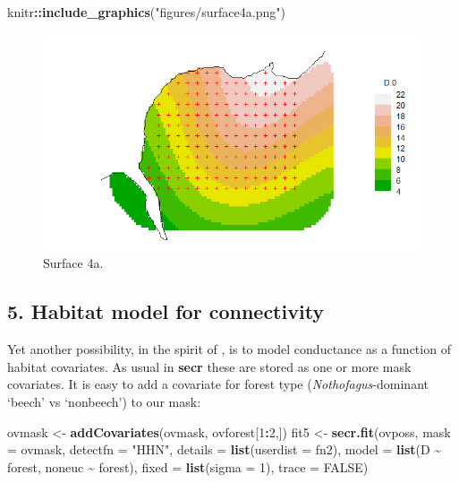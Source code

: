 \documentclass[
]{book}
\newenvironment{Shaded}{\begin{snugshade}}{\end{snugshade}}
\newcommand{\AttributeTok}[1]{\textcolor[rgb]{0.13,0.29,0.53}{#1}}
\newcommand{\ConstantTok}[1]{\textcolor[rgb]{0.56,0.35,0.01}{#1}}
\newcommand{\DecValTok}[1]{\textcolor[rgb]{0.00,0.00,0.81}{#1}}
\newcommand{\FunctionTok}[1]{\textcolor[rgb]{0.13,0.29,0.53}{\textbf{#1}}}
\newcommand{\NormalTok}[1]{#1}
\newcommand{\OtherTok}[1]{\textcolor[rgb]{0.56,0.35,0.01}{#1}}
\newcommand{\SpecialCharTok}[1]{\textcolor[rgb]{0.81,0.36,0.00}{\textbf{#1}}}
\newcommand{\StringTok}[1]{\textcolor[rgb]{0.31,0.60,0.02}{#1}}
\begin{document}
\begin{Shaded}
\begin{Highlighting}[]
\NormalTok{knitr}\SpecialCharTok{::}\FunctionTok{include\_graphics}\NormalTok{(}\StringTok{"figures/surface4a.png"}\NormalTok{)}
\end{Highlighting}
\end{Shaded}

\begin{figure}
\includegraphics[width=0.9\linewidth]{figures/surface4a} \caption{Surface 4a.}\label{fig:surface4a}
\end{figure}

\subsection{5. Habitat model for connectivity}\label{habitat-model-for-connectivity}

Yet another possibility, in the spirit of \citet{rcgg13}, is to model conductance as a function of habitat covariates. As usual in \textbf{secr} these are stored as one or more mask covariates. It is easy to add a covariate for forest type (\emph{Nothofagus}-dominant `beech' vs `nonbeech') to our mask:

\begin{Shaded}
\begin{Highlighting}[]
\NormalTok{ovmask }\OtherTok{\textless{}{-}} \FunctionTok{addCovariates}\NormalTok{(ovmask, ovforest[}\DecValTok{1}\SpecialCharTok{:}\DecValTok{2}\NormalTok{,])}
\NormalTok{fit5 }\OtherTok{\textless{}{-}} \FunctionTok{secr.fit}\NormalTok{(ovposs, }\AttributeTok{mask =}\NormalTok{ ovmask, }\AttributeTok{detectfn =} \StringTok{"HHN"}\NormalTok{,}
    \AttributeTok{details =} \FunctionTok{list}\NormalTok{(}\AttributeTok{userdist =}\NormalTok{ fn2), }\AttributeTok{model =} \FunctionTok{list}\NormalTok{(D }\SpecialCharTok{\textasciitilde{}}\NormalTok{ forest, }
\NormalTok{     noneuc }\SpecialCharTok{\textasciitilde{}}\NormalTok{ forest), }\AttributeTok{fixed =} \FunctionTok{list}\NormalTok{(}\AttributeTok{sigma =} \DecValTok{1}\NormalTok{), }\AttributeTok{trace =} \ConstantTok{FALSE}\NormalTok{)}
\end{Highlighting}
\end{Shaded}
\end{document}
